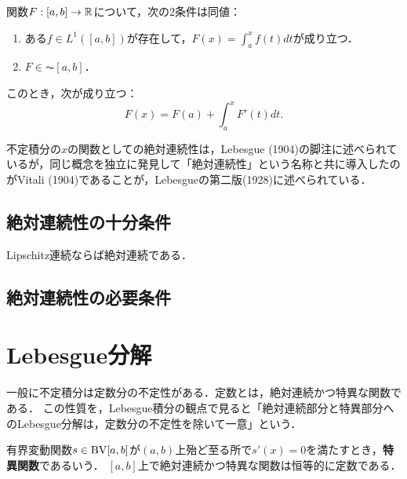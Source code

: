 \documentclass[uplatex, dvipdfmx]{jsreport}
\begin{document}
\begin{theorem}
    関数$F:[a,b]\to\mathbb{R}$について，次の2条件は同値：
    \begin{enumerate}
        \item ある$f\in L^1([a,b])$が存在して，$F(x)=\int^x_af(t)dt$が成り立つ．
        \item $F\in\AC[a,b]$．
    \end{enumerate}
    このとき，次が成り立つ：
    \[F(x)=F(a)+\int^x_aF'(t)dt.\]
\end{theorem}

\begin{history}
    不定積分の$x$の関数としての絶対連続性は，Lebesgue (1904)の脚注に述べられているが，同じ概念を独立に発見して「絶対連続性」という名称と共に導入したのがVitali (1904)であることが，Lebesgueの第二版(1928)に述べられている．
\end{history}

\subsection{絶対連続性の十分条件}

\begin{proposition}
    Lipschitz連続ならば絶対連続である．
\end{proposition}

\subsection{絶対連続性の必要条件}

\section{Lebesgue分解}

\begin{tcolorbox}[colframe=ForestGreen, colback=ForestGreen!10!white,breakable,colbacktitle=ForestGreen!40!white,coltitle=black,fonttitle=\bfseries\sffamily,
title=]
    一般に不定積分は定数分の不定性がある．定数とは，絶対連続かつ特異な関数である．
    この性質を，Lebesgue積分の観点で見ると「絶対連続部分と特異部分へのLebesgue分解は，定数分の不定性を除いて一意」という．
\end{tcolorbox}

\begin{definition}
    有界変動関数$s\in\mathrm{BV}[a,b]$が$(a,b)$上殆ど至る所で$s'(x)=0$を満たすとき，\textbf{特異関数}であるいう．
    $[a,b]$上で絶対連続かつ特異な関数は恒等的に定数である．
\end{definition}
\end{document}
